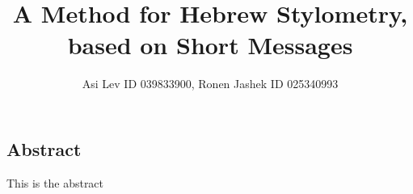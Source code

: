\documentclass[a4paper,twocolumn]{article}
\begin{document}
\author{Asi Lev ID 039833900, Ronen Jashek ID 025340993}
\title{A Method for Hebrew Stylometry, based on Short Messages}
\date{}
\maketitle
\begin{center}
\section*{Abstract}
\end{center}
This is the abstract
\end{document}
